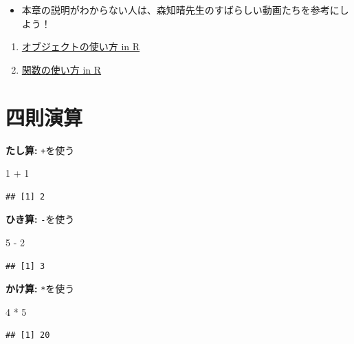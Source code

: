 \documentclass[
]{book}
\newenvironment{Shaded}{\begin{snugshade}}{\end{snugshade}}
\newcommand{\DecValTok}[1]{\textcolor[rgb]{0.00,0.00,0.81}{#1}}
\newcommand{\SpecialCharTok}[1]{\textcolor[rgb]{0.00,0.00,0.00}{#1}}
\providecommand{\tightlist}{%
  \setlength{\itemsep}{0pt}\setlength{\parskip}{0pt}}
\begin{document}
\begin{itemize}
\tightlist
\item
  本章の説明がわからない人は、森知晴先生のすばらしい動画たちを参考にしよう！
\end{itemize}

\begin{enumerate}
\def\labelenumi{\arabic{enumi}.}
\tightlist
\item
  \href{https://youtu.be/CblsIBlzqX0}{オブジェクトの使い方 in R}\\
\item
  \href{https://youtu.be/q8MI6P2hoUM}{関数の使い方 in R}
\end{enumerate}

\hypertarget{ux56dbux5247ux6f14ux7b97}{%
\section{四則演算}\label{ux56dbux5247ux6f14ux7b97}}

\textbf{たし算:} \texttt{+}を使う

\begin{Shaded}
\begin{Highlighting}[]
\DecValTok{1} \SpecialCharTok{+} \DecValTok{1}
\end{Highlighting}
\end{Shaded}

\begin{verbatim}
## [1] 2
\end{verbatim}

\textbf{ひき算:} \texttt{-}を使う

\begin{Shaded}
\begin{Highlighting}[]
\DecValTok{5} \SpecialCharTok{{-}} \DecValTok{2}
\end{Highlighting}
\end{Shaded}

\begin{verbatim}
## [1] 3
\end{verbatim}

\textbf{かけ算:} \texttt{*}を使う

\begin{Shaded}
\begin{Highlighting}[]
\DecValTok{4} \SpecialCharTok{*} \DecValTok{5}
\end{Highlighting}
\end{Shaded}

\begin{verbatim}
## [1] 20
\end{verbatim}
\end{document}
